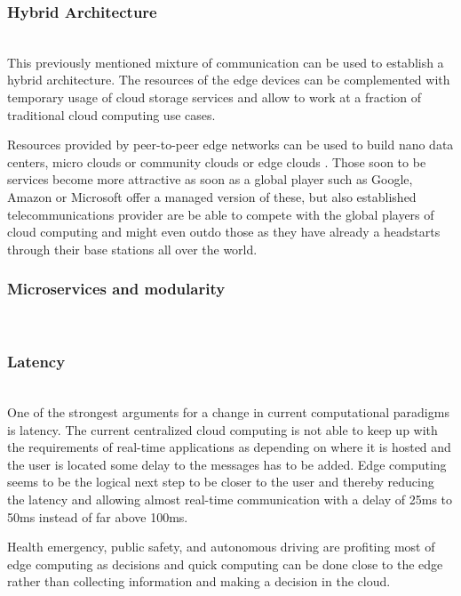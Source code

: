 \subsubsection{Hybrid Architecture}\hspace*{\fill} \\
This previously mentioned mixture of communication can be used to establish a hybrid architecture. The resources of the edge devices can be complemented with temporary usage of cloud storage services  and allow to work at a fraction of traditional cloud computing use cases.

Resources provided by peer-to-peer edge networks can be used to build nano data centers, micro clouds or community clouds or edge clouds . Those soon to be services become more attractive as soon as a global player such as Google, Amazon or Microsoft offer a managed version of these, but also established telecommunications provider are be able to compete with the global players of cloud computing and might even outdo those as they have already a headstarts through their base stations all over the world.

\subsubsection{Microservices and modularity}\hspace*{\fill} \\

\subsubsection{Latency}\hspace*{\fill} \\
One of the strongest arguments for a change in current computational paradigms is latency. The current centralized cloud computing is not able to keep up with the requirements of real-time applications as depending on where it is hosted and the user is located some delay to the messages has to be added.
Edge computing seems to be the logical next step to be closer to the user and thereby reducing the latency and allowing almost real-time communication with a delay of 25ms to 50ms instead of far above 100ms.

Health emergency, public safety, and autonomous driving are profiting most of edge computing as decisions and quick computing can be done close to the edge rather than collecting information and making a decision in the cloud.

